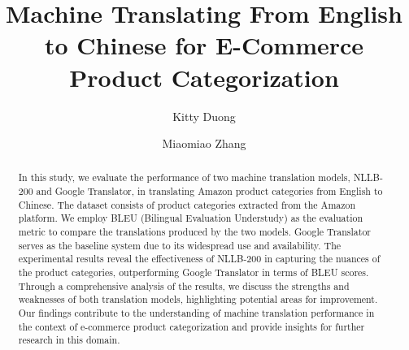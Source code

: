 \documentclass[sigconf]{acmart}
\begin{document}
\title{Machine Translating From English to Chinese for E-Commerce Product Categorization}



\author{Kitty Duong}

\author{Miaomiao Zhang}

\begin{abstract}
    In this study, we evaluate the performance of two machine translation models, NLLB-200\cite{nllb} and Google Translator\cite{baccouri}, in translating Amazon product categories\cite{amazonPromptCloud} from English to Chinese. The dataset consists of product categories extracted from the Amazon platform. We employ BLEU (Bilingual Evaluation Understudy)\cite{nltk.align.bleu_score_nltk_3.0_documentation} as the evaluation metric to compare the translations produced by the two models. Google Translator serves as the baseline system due to its widespread use and availability. The experimental results reveal the effectiveness of NLLB-200\cite{koishekenov_berard_nikoulina_2023} in capturing the nuances of the product categories, outperforming Google Translator in terms of BLEU scores. Through a comprehensive analysis of the results, we discuss the strengths and weaknesses of both translation models\cite{gauch_hwang_fick_2003}, highlighting potential areas for improvement. Our findings contribute to the understanding of machine translation performance\cite{flach_2019} in the context of e-commerce product categorization and provide insights for further research in this domain.
\end{abstract}



\maketitle
\end{document}
